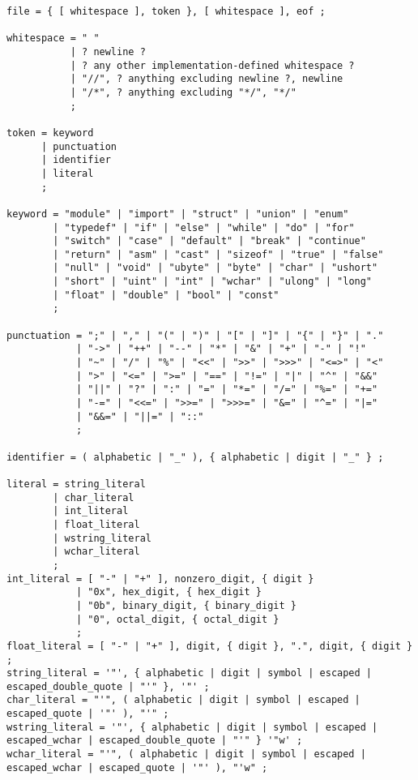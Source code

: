 \documentclass[letterpaper,12pt]{book}
\begin{document}
\begin{lstlisting}[breaklines=true]
file = { [ whitespace ], token }, [ whitespace ], eof ;

whitespace = " "
           | ? newline ?
           | ? any other implementation-defined whitespace ?
           | "//", ? anything excluding newline ?, newline
           | "/*", ? anything excluding "*/", "*/"
           ;

token = keyword
      | punctuation
      | identifier
      | literal
      ;

keyword = "module" | "import" | "struct" | "union" | "enum"
        | "typedef" | "if" | "else" | "while" | "do" | "for"
        | "switch" | "case" | "default" | "break" | "continue"
        | "return" | "asm" | "cast" | "sizeof" | "true" | "false"
        | "null" | "void" | "ubyte" | "byte" | "char" | "ushort"
        | "short" | "uint" | "int" | "wchar" | "ulong" | "long"
        | "float" | "double" | "bool" | "const"
        ;

punctuation = ";" | "," | "(" | ")" | "[" | "]" | "{" | "}" | "."
            | "->" | "++" | "--" | "*" | "&" | "+" | "-" | "!"
            | "~" | "/" | "%" | "<<" | ">>" | ">>>" | "<=>" | "<"
            | ">" | "<=" | ">=" | "==" | "!=" | "|" | "^" | "&&"
            | "||" | "?" | ":" | "=" | "*=" | "/=" | "%=" | "+="
            | "-=" | "<<=" | ">>=" | ">>>=" | "&=" | "^=" | "|="
            | "&&=" | "||=" | "::"
            ;

identifier = ( alphabetic | "_" ), { alphabetic | digit | "_" } ;

literal = string_literal
        | char_literal
        | int_literal
        | float_literal
        | wstring_literal
        | wchar_literal
        ;
int_literal = [ "-" | "+" ], nonzero_digit, { digit }
            | "0x", hex_digit, { hex_digit }
            | "0b", binary_digit, { binary_digit }
            | "0", octal_digit, { octal_digit }
            ;
float_literal = [ "-" | "+" ], digit, { digit }, ".", digit, { digit } ;
string_literal = '"', { alphabetic | digit | symbol | escaped | escaped_double_quote | "'" }, '"' ;
char_literal = "'", ( alphabetic | digit | symbol | escaped | escaped_quote | '"' ), "'" ;
wstring_literal = '"', { alphabetic | digit | symbol | escaped | escaped_wchar | escaped_double_quote | "'" } '"w' ;
wchar_literal = "'", ( alphabetic | digit | symbol | escaped | escaped_wchar | escaped_quote | '"' ), "'w" ;


\end{lstlisting}
\end{document}
